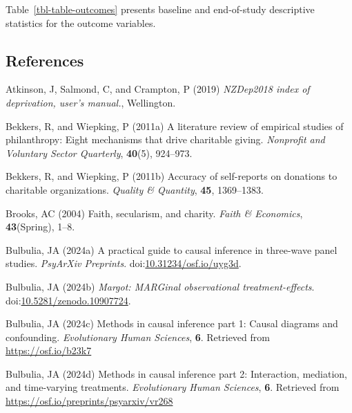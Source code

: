 \documentclass[
  single column]{article}
\newlength{\cslhangindent}
\newenvironment{CSLReferences}[2] %
 {\begin{list}{}{%
  \setlength{\itemindent}{0pt}
  \setlength{\leftmargin}{0pt}
  \setlength{\parsep}{0pt}
  \ifodd #1
   \setlength{\leftmargin}{\cslhangindent}
   \setlength{\itemindent}{-1\cslhangindent}
  \fi
  \setlength{\itemsep}{#2\baselineskip}}}
 {\end{list}}
\begin{document}
Table~\ref{tbl-table-outcomes} presents baseline and end-of-study
descriptive statistics for the outcome variables.

\newpage{}

\subsection*{References}\label{references}

\label{refs}
\begin{CSLReferences}{1}{0}
Atkinson, J, Salmond, C, and Crampton, P (2019) \emph{NZDep2018 index of
deprivation, user{'}s manual.}, Wellington.

Bekkers, R, and Wiepking, P (2011a) A literature review of empirical
studies of philanthropy: Eight mechanisms that drive charitable giving.
\emph{Nonprofit and Voluntary Sector Quarterly}, \textbf{40}(5),
924--973.

Bekkers, R, and Wiepking, P (2011b) Accuracy of self-reports on
donations to charitable organizations. \emph{Quality \& Quantity},
\textbf{45}, 1369--1383.

Brooks, AC (2004) Faith, secularism, and charity. \emph{Faith \&
Economics}, \textbf{43}(Spring), 1--8.

Bulbulia, JA (2024a) A practical guide to causal inference in three-wave
panel studies. \emph{PsyArXiv Preprints}.
doi:\href{https://doi.org/10.31234/osf.io/uyg3d}{10.31234/osf.io/uyg3d}.

Bulbulia, JA (2024b) \emph{Margot: MARGinal observational
treatment-effects}.
doi:\href{https://doi.org/10.5281/zenodo.10907724}{10.5281/zenodo.10907724}.

Bulbulia, JA (2024c) Methods in causal inference part 1: Causal diagrams
and confounding. \emph{Evolutionary Human Sciences}, \textbf{6}.
Retrieved from \url{https://osf.io/b23k7}

Bulbulia, JA (2024d) Methods in causal inference part 2: Interaction,
mediation, and time-varying treatments. \emph{Evolutionary Human
Sciences}, \textbf{6}. Retrieved from
\url{https://osf.io/preprints/psyarxiv/vr268}


\end{CSLReferences}
\end{document}
